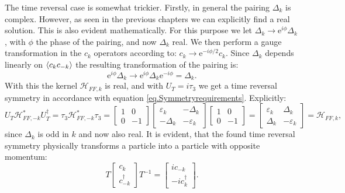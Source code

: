 The time reversal case is somewhat trickier. Firstly, in general the pairing $\Delta_k$ is complex. However, as seen in the previous chapters we can explicitly find a real solution. This is also evident mathematically. For this purpose we let $\Delta_k \to \text{e}^{i\phi}\Delta_k$, with $\phi$ the phase of the pairing, and now $\Delta_k$ real. We then perform a gauge transformation in the $c_k$ operators according to: $c_k \to \text{e}^{-i\phi/2} c_k$. Since $\Delta_k$ depends linearly on $\braket{c_kc_{-k}}$ the resulting transformation of the pairing is:
\begin{equation}
\text{e}^{i\phi}\Delta_k \to \text{e}^{i\phi}\Delta_k\text{e}^{-i\phi} = \Delta_k. \nonumber
\end{equation}
With this the kernel $\mathcal{H}_{FF,k}$ is real, and with $U_T = i\tau_3$ we get a time reversal symmetry in accordance with equation \ref{eq.Symmetryrequirements}. Explicitly:
\begin{equation}
U_T\mathcal{H}^*_{FF,-k}U^\dagger_T = \tau_3\mathcal{H}^*_{FF,-k}\tau_3 = \begin{bmatrix} 1 & 0 \\ 0 & -1 \end{bmatrix}\begin{bmatrix} \varepsilon_k & -\Delta_k \\ -\Delta_k & -\varepsilon_k \end{bmatrix} \begin{bmatrix} 1 & 0 \\ 0 & -1 \end{bmatrix} = \begin{bmatrix} \varepsilon_k & \Delta_k \\ \Delta_k & -\varepsilon_k \end{bmatrix} = \mathcal{H}_{FF,k}, \nonumber
\end{equation}
since $\Delta_k$ is odd in $k$ and now also real. It is evident, that the found time reversal symmetry physically transforms a particle into a particle with opposite momentum:
\begin{equation}
T \begin{bmatrix} c_k \\ c^\dagger_{-k} \end{bmatrix} T^{-1} = \begin{bmatrix} i c_{-k} \\ - i c^\dagger_{k} \end{bmatrix}. \nonumber
\end{equation}
